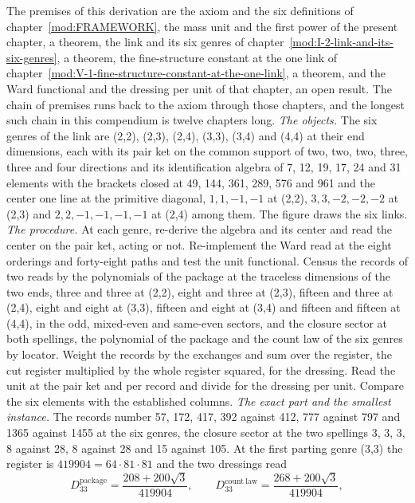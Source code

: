 \begin{chproof}
The premises of this derivation are the axiom and the six definitions of chapter~\ref{mod:FRAMEWORK}, the mass unit and the first power of the present chapter, a theorem, the link and its six genres of chapter~\ref{mod:I-2-link-and-its-six-genres}, a theorem, the fine-structure constant at the one link of chapter~\ref{mod:V-1-fine-structure-constant-at-the-one-link}, a theorem, and the Ward functional and the dressing per unit of that chapter, an open result. The chain of premises runs back to the axiom through those chapters, and the longest such chain in this compendium is twelve chapters long.
\textit{The objects.} The six genres of the link are (2,2), (2,3), (2,4), (3,3), (3,4) and (4,4) at their end dimensions, each with its pair ket on the common support of two, two, two, three, three and four directions and its identification algebra of 7, 12, 19, 17, 24 and 31 elements with the brackets closed at 49, 144, 361, 289, 576 and 961 and the center one line at the primitive diagonal, $1,1,-1,-1$ at (2,2), $3,3,-2,-2,-2$ at (2,3) and $2,2,-1,-1,-1,-1$ at (2,4) among them. The figure draws the six links.
\textit{The procedure.} At each genre, re-derive the algebra and its center and read the center on the pair ket, acting or not. Re-implement the Ward read at the eight orderings and forty-eight paths and test the unit functional. Census the records of two reads by the polynomials of the package at the traceless dimensions of the two ends, three and three at (2,2), eight and three at (2,3), fifteen and three at (2,4), eight and eight at (3,3), fifteen and eight at (3,4) and fifteen and fifteen at (4,4), in the odd, mixed-even and same-even sectors, and the closure sector at both spellings, the polynomial of the package and the count law of the six genres by locator. Weight the records by the exchanges and sum over the register, the cut register multiplied by the whole register squared, for the dressing. Read the unit at the pair ket and per record and divide for the dressing per unit. Compare the six elements with the established columns.
\textit{The exact part and the smallest instance.} The records number 57, 172, 417, 392 against 412, 777 against 797 and 1365 against 1455 at the six genres, the closure sector at the two spellings 3, 3, 3, 8 against 28, 8 against 28 and 15 against 105. At the first parting genre (3,3) the register is $419904 = 64\cdot 81\cdot 81$ and the two dressings read
\begin{equation} D_{33}^{\mathrm{package}} = \frac{208 + 200\sqrt{3}}{419904}, \qquad D_{33}^{\mathrm{count\ law}} = \frac{268 + 200\sqrt{3}}{419904}, \end{equation}

\end{chproof}
